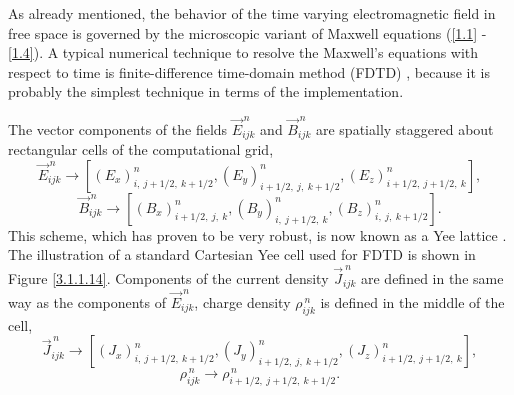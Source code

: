 As already mentioned, the behavior of the time varying electromagnetic field in free space is governed by the microscopic variant of Maxwell equations (\ref{1.1} - \ref{1.4}). A typical numerical technique to resolve the Maxwell's equations with respect to time is finite-difference time-domain method (FDTD) \cite{yee}, because it is probably the simplest technique in terms of the implementation.

The vector components of the fields $ \vec{E}_{ijk}^{\,n} $ and $ \vec{B}_{ijk}^{\,n} $ are spatially staggered about rectangular cells of the computational grid,
\begin{equation}
\label{3.1.1.4}
\vec{E}_{ijk}^{\,n} \rightarrow \left[\left(E_{x}\right)^{n}_{i,\: j + 1/2,\: k + 1/2}, \left(E_{y}\right)^{n}_{i + 1/2,\: j,\: k + 1/2}, \left(E_{z}\right)^{n}_{i + 1/2,\: j + 1/2,\: k} \right],
\end{equation}
\begin{equation}
\label{3.1.1.5}
\vec{B}_{ijk}^{\,n} \rightarrow \left[\left(B_{x}\right)^{n}_{i + 1/2,\: j,\: k}, \left(B_{y}\right)^{n}_{i,\: j + 1/2,\: k}, \left(B_{z}\right)^{n}_{i,\: j,\: k + 1/2} \right].
\end{equation}
This scheme, which has proven to be very robust, is now known as a Yee lattice \cite{yee}. The illustration of a standard Cartesian Yee cell used for FDTD is shown in Figure \ref{3.1.1.14}. Components of the current density $ \vec{J}_{ijk}^{\:n} $ are defined in the same way as the components of $ \vec{E}_{ijk}^{\:n} $, charge density $ \rho_{ijk}^{\:n} $ is defined in the middle of the cell,
\begin{equation}
\vec{J}_{ijk}^{\,n} \rightarrow \left[\left(J_{x}\right)^{n}_{i,\: j + 1/2,\: k + 1/2}, \left(J_{y}\right)^{n}_{i + 1/2,\: j,\: k + 1/2}, \left(J_{z}\right)^{n}_{i + 1/2,\: j + 1/2,\: k} \right],
\end{equation}
\begin{equation}
\rho_{ijk}^{\,n} \rightarrow \rho_{i + 1/2,\: j + 1/2,\: k + 1/2}^{\,n}.
\end{equation}

